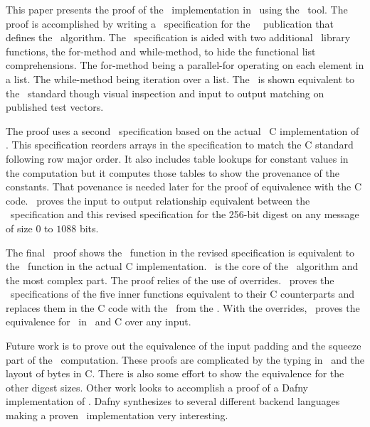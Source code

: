 This paper presents the proof of the \shaThree\ implementation in \openssl\ using the \saw\ tool.
The proof is accomplished by writing a \cryptol\ specification for the \nist\ \fips\ publication that defines the \shaThree\ algorithm.
The \cryptol\ specification is aided with two additional \cryptol\ library functions, the for-method and while-method, to hide the functional list comprehensions.
The for-method being a parallel-for operating on each element in a list.
The while-method being iteration over a list.
The \cryptol\ is shown equivalent to the \fips\ standard though visual inspection and input to output matching on published test vectors.

The proof uses a second \cryptol\ specification based on the actual \openssl\ C implementation of \shaThree.
This specification reorders arrays in the specification to match the C standard following row major order.
It also includes table lookups for constant values in the computation but it computes those tables to show the provenance of the constants.
That povenance is needed later for the proof of equivalence with the C code.
\saw\ proves the input to output relationship equivalent between the \fips\ specification and this revised specification for the 256-bit digest on any message of size $0$ to $1088$ bits.

The final \saw\ proof shows the \keccak\ function in the revised specification is equivalent to the \keccak\ function in the actual C implementation.
\keccak\ is the core of the \shaThree\ algorithm and the most complex part.
The proof relies of the use of overrides.
\saw\ proves the \cryptol\ specifications of the five inner \keccak functions equivalent to their C counterparts and replaces them in the C code with the \sawcore\ from the \cryptol.
With the overrides, \saw\ proves the equivalence for \keccak\ in \cryptol\ and C over any input.

Future work is to prove out the equivalence of the input padding and the squeeze part of the \shaThree\ computation.
These proofs are complicated by the typing in \cryptol\ and the layout of bytes in C.
There is also some effort to show the equivalence for the other digest sizes.
Other work looks to accomplish a proof of a Dafny implementation of \shaThree.
Dafny synthesizes to several different backend languages making a proven \shaThree\ implementation very interesting.

